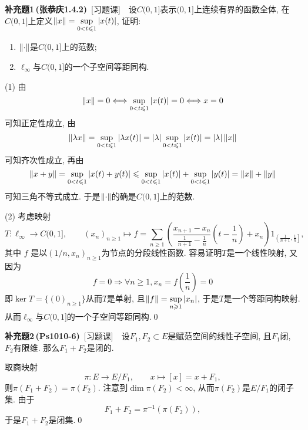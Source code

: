 	\textbf{补充题1\,(张恭庆1.4.2)}\ [习题课]\ \ 设$ C(0,1] $表示$ (0,1] $上连续有界的函数全体, 在$ C(0,1] $上定义$ \left\| x \right\|=\sup\limits_{0<t\leqslant 1}\left| x(t) \right|  $, 证明:
	\begin{enumerate}[(1)]
	\item $ \left\| \cdot \right\| $是$ C(0,1] $上的范数;
	\item $ \ell_\infty $与$ C(0,1] $的一个子空间等距同构.
	\end{enumerate}
	\begin{Proof}
	(1) 由
	\[
	\left\| x \right\|=0\Longleftrightarrow\sup_{0<t\leqslant 1}\left| x(t) \right| =0\Longleftrightarrow x=0
	\]
	可知正定性成立, 由
	\[
	\left\| \lambda x \right\|=\sup_{0<t\leqslant 1}\left| \lambda x(t) \right| =\left| \lambda \right| \sup_{0<t\leqslant 1}\left| x(t) \right| =\left| \lambda \right| \left\| x \right\|
	\]
	可知齐次性成立, 再由
	\[
	\left\| x+y \right\|=\sup_{0<t\leqslant 1}\left| x(t)+y(t) \right| \leqslant\sup_{0<t\leqslant 1}\left| x(t) \right| +\sup_{0<t\leqslant 1}\left| y(t) \right| =\left\| x \right\|+\left\| y \right\|
	\]
	可知三角不等式成立. 于是$ \left\| \cdot \right\| $的确是$ C(0,1] $上的范数.
	
	(2) 考虑映射
	\[
	T : \ell_\infty\to C(0,1],\qquad (x_n)_{n\geqslant 1}\mapsto f=\sum_{n\geqslant 1}\left(\frac{x_{n+1}-x_n}{\frac{1}{n+1}-\frac{1}{n}}\left(t-\frac{1}{n}\right)+x_n\right)1_{\left( \frac{1}{n+1},\frac{1}{n} \right]},
	\]
	其中 $ f $ 是以$ (1/n,x_n)_{n\geqslant 1} $为节点的分段线性函数. 容易证明$ T $是一个线性映射, 又因为
	\[
	f=0\Longrightarrow \forall n\geqslant 1, x_n=f\left(\frac{1}{n}\right)=0
	\]
	即$ \ker T=\{ (0)_{n\geqslant 1} \} $从而$ T $是单射, 且$ \left\| f \right\|=\sup\limits_{n\geqslant 1}\left| x_n \right|  $, 于是$ T $是一个等距同构映射. 从而$ \ell_\infty $与$ C(0,1] $的一个子空间等距同构.\qed
	\end{Proof}

	\textbf{补充题2\,(Ps1010-6)}\ [习题课]\ \ 设$ F_1,F_2\subset E $是赋范空间的线性子空间, 且$ F_1 $闭, $ F_2 $有限维. 那么$ F_1+F_2 $是闭的.
	\begin{Proof}
	取商映射
	\[
	\pi : E\to E/F_1,\qquad x\mapsto [x]=x+F_1,
	\]
	则$ \pi(F_1+F_2)=\pi(F_2) $. 注意到$ \dim\pi(F_2)<\infty $, 从而$ \pi(F_2) $是$ E/F_1 $的闭子集. 由于
	\[
	F_1+F_2=\pi^{-1}(\pi(F_2)),
	\]
	于是$ F_1+F_2 $是闭集.\qed
	\end{Proof}

